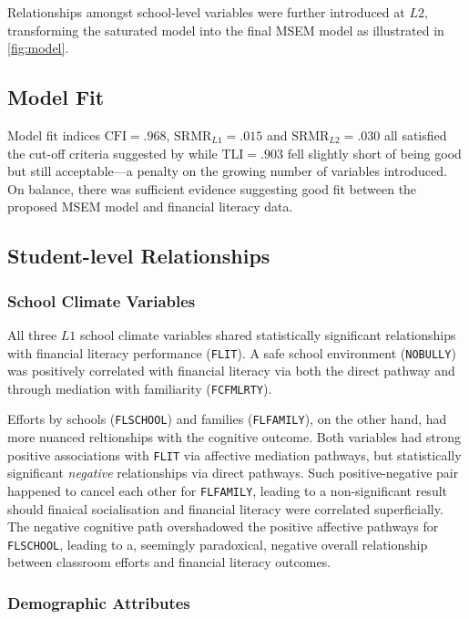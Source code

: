 \documentclass[a4paper,11pt,UKenglish,twoside,openright]{report}\usepackage[]{graphicx}\usepackage[]{color}
\begin{document}
Relationships amongst school-level variables were further introduced at $L2$, transforming the saturated model into the final MSEM model as illustrated in \cref{fig:model}.

\subsection{Model Fit}

Model fit indices $\text{CFI} = .968$, $\text{SRMR}_{L1} = .015$ and $\text{SRMR}_{L2} =.030$ all satisfied the cut-off criteria suggested by \textcite{hu:1999} while $\text{TLI} = .903$ fell slightly short of being good but still acceptable---a penalty on the growing number of variables introduced. On balance, there was sufficient evidence suggesting good fit between the proposed MSEM model and financial literacy data.

\subsection{Student-level Relationships}

\subsubsection{School Climate Variables}

All three $L1$ school climate variables shared statistically significant relationships with financial literacy performance (\texttt{FLIT}). A safe school environment (\texttt{NOBULLY}) was positively correlated with financial literacy via both the direct pathway and through mediation with familiarity (\texttt{FCFMLRTY}).

Efforts by schools (\texttt{FLSCHOOL}) and families (\texttt{FLFAMILY}), on the other hand, had more nuanced reltionships with the cognitive outcome. Both variables had strong positive associations with \texttt{FLIT} via affective mediation pathways, but statistically significant \emph{negative} relationships via direct pathways. Such positive-negative pair happened to cancel each other for \texttt{FLFAMILY}, leading to a non-significant result should finaical socialisation and financial literacy were correlated superficially. The negative cognitive path overshadowed the positive affective pathways for \texttt{FLSCHOOL}, leading to a, seemingly paradoxical, negative overall relationship between classroom efforts and financial literacy outcomes.

\subsubsection{Demographic Attributes}
\end{document}
